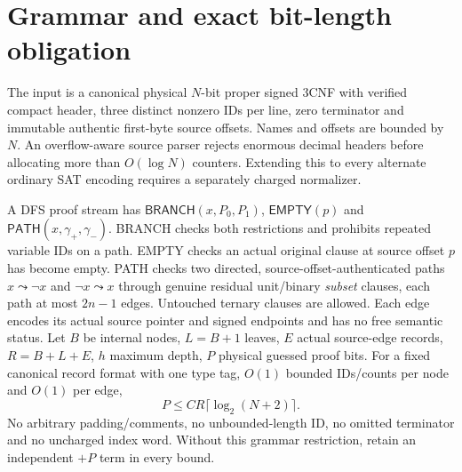\documentclass[11pt]{article}
\begin{document}
\section{Grammar and exact bit-length obligation}
The input is a canonical physical \(N\)-bit proper signed 3CNF with verified compact header, three distinct nonzero IDs per line, zero terminator and immutable authentic first-byte source offsets. Names and offsets are bounded by \(N\). An overflow-aware source parser rejects enormous decimal headers before allocating more than \(O(\log N)\) counters. Extending this to every alternate ordinary SAT encoding requires a separately charged normalizer.

A DFS proof stream has \(\mathsf{BRANCH}(x,P_0,P_1)\), \(\mathsf{EMPTY}(p)\) and \(\mathsf{PATH}(x,\gamma_+,\gamma_-)\). BRANCH checks both restrictions and prohibits repeated variable IDs on a path. EMPTY checks an actual original clause at source offset \(p\) has become empty. PATH checks two directed, source-offset-authenticated paths \(x\leadsto\neg x\) and \(\neg x\leadsto x\) through genuine residual unit/binary \emph{subset} clauses, each path at most \(2n-1\) edges. Untouched ternary clauses are allowed. Each edge encodes its actual source pointer and signed endpoints and has no free semantic status. Let \(B\) be internal nodes, \(L=B+1\) leaves, \(E\) actual source-edge records, \(R=B+L+E\), \(h\) maximum depth, \(P\) physical guessed proof bits. For a fixed canonical record format with one type tag, \(O(1)\) bounded IDs/counts per node and \(O(1)\) per edge,
\[
P\le C R\lceil\log_2(N+2)\rceil.
\]
No arbitrary padding/comments, no unbounded-length ID, no omitted terminator and no uncharged index word. Without this grammar restriction, retain an independent \(+P\) term in every bound.
\end{document}
